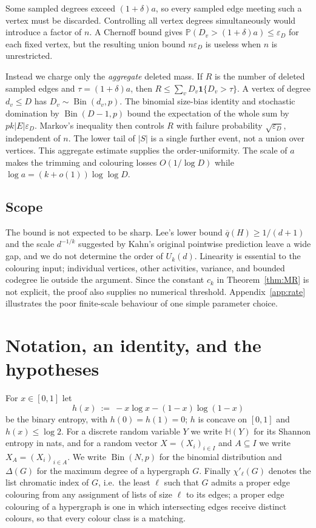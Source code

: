 \documentclass[10pt,a4paper]{amsart}
\newcommand{\EE}{E}
\newcommand{\PP}{\mathbb{P}}
\newcommand{\Ent}{\mathbb{H}}
\newcommand{\qbar}{\overline{q}}
\newcommand{\Bin}{\operatorname{Bin}}
\newcommand{\chil}{\chi'_{\ell}}
\newcommand{\Deltaop}{\Delta}
\begin{document}
Some sampled degrees exceed $(1+\delta)a$, so every sampled edge meeting such a vertex
must be discarded. Controlling all vertex degrees simultaneously would introduce a factor
of $n$. A Chernoff bound gives
$\PP(D_v>(1+\delta)a)\le\varepsilon_D$ for each fixed vertex, but the resulting union
bound $n\varepsilon_D$ is useless when $n$ is unrestricted.

Instead we charge only the \emph{aggregate} deleted mass. If $R$ is the number of deleted
sampled edges and $\tau=(1+\delta)a$, then
$R\le\sum_vD_v\mathbf1\{D_v>\tau\}$. A vertex of degree $d_v\le D$ has
$D_v\sim\Bin(d_v,p)$. The binomial size-bias identity and stochastic domination by
$\Bin(D-1,p)$ bound the expectation of the whole sum by
$pk|\EE|\varepsilon_D$. Markov's inequality then controls $R$ with failure probability
$\sqrt{\varepsilon_D}$, independent of $n$. The lower tail of $|S|$ is a single further
event, not a union over vertices. This aggregate estimate supplies the order-uniformity.
The scale of $a$ makes the trimming and colouring losses $O(1/\log D)$ while
$\log a=(k+o(1))\log\log D$.

\subsection{Scope}
\label{subsec:scope}

The bound is not expected to be sharp. Lee's lower bound $\qbar(H)\ge1/(d+1)$ and the
scale $d^{-1/k}$ suggested by Kahn's original pointwise prediction leave a wide gap, and
we do not determine the order of $U_k(d)$. Linearity is essential to the colouring input;
individual vertices, other activities, variance, and bounded codegree lie outside the
argument. Since the constant $c_k$ in Theorem~\ref{thm:MR} is not explicit, the proof also
supplies no numerical threshold. Appendix~\ref{app:rate} illustrates the poor finite-scale
behaviour of one simple parameter choice.

\section{Notation, an identity, and the hypotheses}
\label{sec:setup}

For $x\in[0,1]$ let
\[
  h(x)\ :=\ -x\log x-(1-x)\log(1-x)
\]
be the binary entropy, with $h(0)=h(1)=0$; $h$ is concave on $[0,1]$ and $h(x)\le\log2$.
For a discrete random variable $Y$ we write $\Ent(Y)$ for its Shannon entropy in nats, and
for a random vector $X=(X_i)_{i\in I}$ and $A\subseteq I$ we write $X_A=(X_i)_{i\in A}$. We
write $\Bin(N,p)$ for the binomial distribution and $\Deltaop(G)$ for the maximum degree of
a hypergraph $G$. Finally $\chil(G)$ denotes the list chromatic index of $G$, i.e.\ the
least $\ell$ such that $G$ admits a proper edge colouring from any assignment of lists of
size $\ell$ to its edges; a proper edge colouring of a hypergraph is one in which
intersecting edges receive distinct colours, so that every colour class is a matching.
\end{document}
